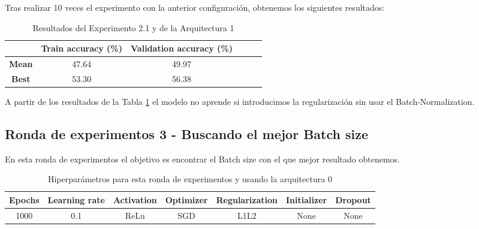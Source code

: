 \documentclass{article}
\begin{document}
			Tras realizar 10 veces el experimento con la anterior configuraci\'on, obtenemos los siguientes resultados:
			\begin{table}[!h]
				\begin{center}
					\begin{tabular}{ c | c | c | c | c | c |}
						\ & \textbf{Train accuracy (\%)} & \textbf{Validation accuracy (\%)}  \\ \hline
						\textbf{Mean} & 47.64 & 49.97 \\ \hline
						\textbf{Best} & 53.30 & 56.38 \\ \hline
					\end{tabular}
					\caption{Resultados del Experimento 2.1 y de la Arquitectura 1}
					\label{tab:res-j-a0-e2.1}
				\end{center}
			\end{table}
      
		    A partir de los resultados de la Tabla \ref{tab:res-j-a0-e2.1} el modelo no aprende si introducimos la regularizaci\'on sin usar el Batch-Normalization.
      
     
    \subsection{Ronda de experimentos 3 - Buscando el mejor Batch size}
		\label{j-s-a0-e3} %
			En esta ronda de experimentos el objetivo es encontrar el Batch size con el que mejor resultado obtenemos.
            
			\begin{table}[h!]
				\begin{center}
					\begin{tabular}{| c | c | c | c | c | c | c |}
						\textbf{Epochs} & \textbf{Learning rate} & \textbf{Activation} & \textbf{Optimizer} & \textbf{Regularization} & \textbf{Initializer} & \textbf{Dropout}\\ \hline
						1000 & 0.1 & ReLu & SGD & L1L2 & None & None
					\end{tabular}
					\caption{Hiperpar\'ametros para esta ronda de experimentos y usando la arquitectura 0}
					\label{tab:hip-j-a0-e3}
				\end{center}
			\end{table}
			
\end{document}
